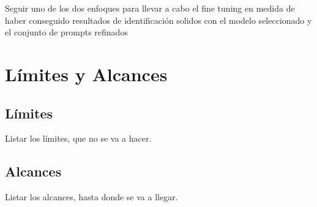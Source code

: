 
Seguir uno de los dos enfoques para llevar a cabo el fine tuning en medida de haber conseguido resultados de identificaci{\'{o}}n solidos con el modelo seleccionado y el conjunto de prompts refinados





\section{Límites y Alcances}
\subsection{Límites}
Listar los límites, que no se va a hacer.

\subsection{Alcances}
Listar los alcances, hasta donde se va a llegar.








